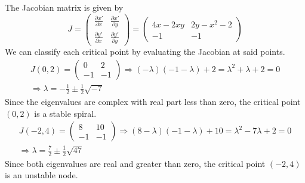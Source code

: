 \documentclass[11pt, titlepage]{article}
\begin{document}
\begin{enumerate}
\begin{solution}
                The Jacobian matrix is given by
                \[
                J = 
                \begin{pmatrix}
                    \frac{\partial x'}{\partial x} & \frac{\partial x'}{\partial
                    y} \\
                    \frac{\partial y'}{\partial x} & \frac{\partial
                    y'}{\partial y}
                \end{pmatrix} =
                \begin{pmatrix}
                    4x - 2xy & 2y - x^2 - 2 \\
                    -1 & -1
                \end{pmatrix}
                \] 
                We can classify each critical point by evaluating the Jacobian
                at said points.
                \begin{gather*}
                    J(0, 2) = 
                    \begin{pmatrix}
                        0 & 2 \\
                        -1 & -1
                    \end{pmatrix} \Longrightarrow
                    (-\lambda)(-1 - \lambda) + 2 = \lambda^2 + \lambda
                    + 2 = 0 \\
                    \Longrightarrow \lambda = -\frac{1}{2} \pm
                    \frac{1}{2} \sqrt{-7}
                \end{gather*}
                Since the eigenvalues are complex with real part less than zero,
                the critical point $(0, 2)$ is a stable spiral.
                \begin{gather*}
                    J(-2, 4) =
                    \begin{pmatrix}
                        8 & 10 \\
                        -1 & -1
                    \end{pmatrix} \Longrightarrow
                    (8 - \lambda)(-1 - \lambda) + 10 = \lambda^2 - 7\lambda + 2 =
                    0 \\
                    \Longrightarrow \lambda = \frac{7}{2} \pm
                    \frac{1}{2}\sqrt{47}
                \end{gather*}
                Since both eigenvalues are real and greater than zero, the
                critical point $(-2, 4)$ is an unstable node.
                \begin{gather*}

\end{gather*}
\end{solution}
\end{enumerate}
\end{document}
